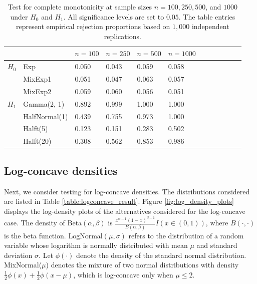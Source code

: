 \documentclass[12pt,letterpaper, twoside, openany]{article}
\theoremstyle{plain}
\begin{document}
\begin{table}
\centering
\begin{tabular}{lllllll|lllll}
\hline
& & $n=100$ & $n=250$ & $n=500$ & $n=1000$\\ \hline
$H_0$  & Exp & 0.050 & 0.043 & 0.059 & 0.058 \\ 
  &MixExp1 & 0.051 & 0.047 & 0.063 & 0.057 \\ 
  &MixExp2 & 0.059 & 0.060 & 0.056 & 0.051 \\    \hline
  $H_1$& Gamma(2, 1) & 0.892 & 0.999 & 1.000 & 1.000 \\ 
  & HalfNormal(1) & 0.439 & 0.755 & 0.973 & 1.000 \\ 
  & Halft(5) & 0.123 & 0.151 & 0.283 & 0.502 \\  
  & Halft(20) & 0.308 & 0.562 & 0.853 & 0.986 \\ 
   \hline
\end{tabular}
\caption{Test for complete monotonicity at sample sizes $n=100, 250, 500$, and $1000$ under $H_0$ and $H_1$. All significance levels are set to $0.05$. The table entries represent empirical rejection proportions based on $1{,}000$ independent replications.}
    \label{table:completely_monotone}
\end{table}


\subsection{Log-concave densities}
Next, we consider testing for log-concave densities. The distributions considered are listed in Table \ref{table:logconcave_result}. Figure \ref{fig:log_density_plots} displays the log-density plots of the alternatives considered for the log-concave case. The density of Beta$(\alpha,\beta)$ is $\frac{x^{\alpha-1}(1-x)^{\beta-1}}{B(\alpha,\beta)}I(x \in (0, 1))$, where $B(\cdot,\cdot)$ is the beta function. LogNormal$(\mu,\sigma)$ refers to the distribution of a random variable whose logarithm is normally distributed with mean $\mu$ and standard deviation $\sigma$. Let $\phi(\cdot)$ denote the density of the standard normal distribution. MixNormal($\mu$) denotes the mixture of two normal distributions with density $\frac{1}{2}\phi(x) + \frac{1}{2}\phi(x-\mu)$, which is log-concave only when $\mu \leq 2$.  
\end{document}
